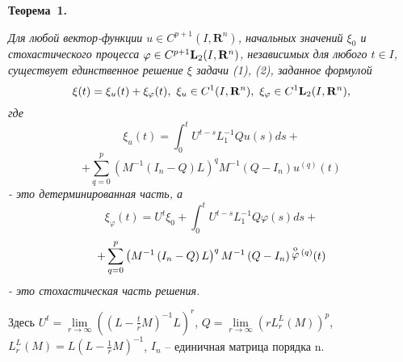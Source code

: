 \textbf{Теорема~1.} {\it
Для любой вектор-функции $u \in C^{p+1} (I ,{\mathbf R}^{n} )$, начальных значений $\xi _{0}$ и стохастического процесса $\varphi \in C^{p+1} {\bf L}_{2} (I ,{\mathbf R}^{n} )$, независимых для любого $t\in I $, существует единственное решение $\xi $ задачи (1), (2), заданное формулой
  $$
  \xi (t)=\xi_{u}(t)+\xi_{\varphi} (t), \ \xi_u \in C^{1}(I ,{\mathbf R}^{n}),\ \xi_{\varphi} \in C^{1} {\bf L}_{2} (I ,{\mathbf R}^{n} ),
  $$
где
$$
\xi_{u}(t)=\!\int _{0}^{t}U ^{t-s}  L_{1}^{-1} Qu (s)ds+
$$
$$
+\sum _{q=0}^{p}\left(M^{-1} \left(I_{n} -Q\right)L\right)^{q} M^{-1} \left(Q-I_{n} \right)u^{(q)} (t)
$$
- это детерминированная часть, а
$$
\xi_{\varphi} (t)=U ^{t} \xi _{0} +\int _{0}^{t}U ^{t-s}  L_{1}^{-1} Q\varphi (s)ds+
$$
$$
+\sum _{q=0}^{p}\left(M^{-1} \left(I_{n} -Q\right)L\right)^{q} M^{-1} \left(Q-I_{n} \right) \mathop{\varphi }\limits^{{\rm o}}{}^{(q)} (t)
$$
- это стохастическая часть решения.
	
	Здесь $U ^{t} =\lim \limits_{r \to \infty } \left( \left( L-{\frac{t}{r}} M\right)^{-1} L \right)^{r} $,
	$Q=\lim \limits_{r \to \infty} \left( rL_{r}^{L} (M) \right)^{p} $,
	$L_{r}^{L} (M)  \! = \!\! L \! \left(L-{\frac{1}{r}} M \right)^{-1} \!\!$,
	 $I_{n} \!$ -- единичная матрица порядка n.
}



